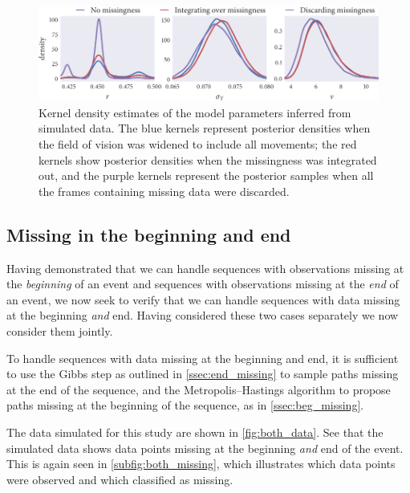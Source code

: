\begin{figure}
  \includegraphics{end/compare_params.pdf}
  \caption{Kernel density estimates of the model parameters inferred from
  simulated data. The blue kernels represent posterior densities when the
  field of vision was widened to include all movements; the red kernels
  show posterior densities when the missingness was integrated out, and the
  purple kernels represent the posterior samples when all the frames
  containing missing data were discarded.}
  \label{fig:end_compare}
\end{figure}

\subsection{Missing in the beginning and end}

Having demonstrated that we can handle sequences with observations missing at
the \emph{beginning} of an event and sequences with observations missing at the
\emph{end} of an event, we now seek to verify that we can handle sequences with
data missing at the beginning \emph{and} end. Having considered these two cases
separately we now consider them jointly. 

To handle sequences with data missing at the beginning and end, it is
sufficient to use the Gibbs step as outlined in \cref{ssec:end_missing} to
sample paths missing at the end of the sequence, and the Metropolis--Hastings
algorithm to propose paths missing at the beginning of the sequence, as in
\cref{ssec:beg_missing}.

The data simulated for this study are shown in \cref{fig:both_data}. See that
the simulated data shows data points missing at the beginning \emph{and} end of
the event. This is again seen in \ref{subfig:both_missing}, which illustrates
which data points were observed and which classified as missing.

